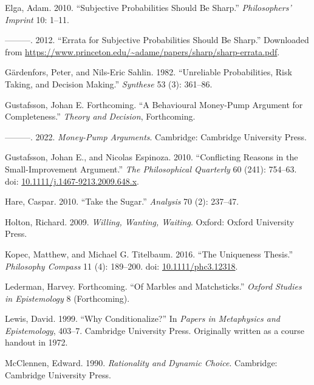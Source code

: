 \documentclass[
  11pt,
  letterpaper,
  DIV=11,
  numbers=noendperiod,
  twoside]{scrartcl}
\newlength{\cslhangindent}
\newenvironment{CSLReferences}[2] %
 {\begin{list}{}{%
  \setlength{\itemindent}{0pt}
  \setlength{\leftmargin}{0pt}
  \setlength{\parsep}{0pt}
  \ifodd #1
   \setlength{\leftmargin}{\cslhangindent}
   \setlength{\itemindent}{-1\cslhangindent}
  \fi
  \setlength{\itemsep}{#2\baselineskip}}}
 {\end{list}}
\begin{document}
\begin{CSLReferences}{1}{0}
Elga, Adam. 2010. {``Subjective Probabilities Should Be Sharp.''}
\emph{Philosophers' Imprint} 10: 1--11.

---------. 2012. {``Errata for Subjective Probabilities Should Be
Sharp.''} Downloaded from
\url{https://www.princeton.edu/~adame/papers/sharp/sharp-errata.pdf}.

Gärdenfors, Peter, and Nils-Eric Sahlin. 1982. {``Unreliable
Probabilities, Risk Taking, and Decision Making.''} \emph{Synthese} 53
(3): 361--86.

Gustafsson, Johan E. Forthcoming. {``A Behavioural Money-Pump Argument
for Completeness.''} \emph{Theory and Decision}, Forthcoming.

---------. 2022. \emph{Money-Pump Arguments}. Cambridge: Cambridge
University Press.

Gustafsson, Johan E., and Nicolas Espinoza. 2010. {``Conflicting Reasons
in the Small-Improvement Argument.''} \emph{The Philosophical Quarterly}
60 (241): 754--63. doi:
\href{https://doi.org/10.1111/j.1467-9213.2009.648.x}{10.1111/j.1467-9213.2009.648.x}.

Hare, Caspar. 2010. {``Take the Sugar.''} \emph{Analysis} 70 (2):
237--47.

Holton, Richard. 2009. \emph{Willing, Wanting, Waiting}. Oxford: Oxford
University Press.

Kopec, Matthew, and Michael G. Titelbaum. 2016. {``The Uniqueness
Thesis.''} \emph{Philosophy Compass} 11 (4): 189--200. doi:
\href{https://doi.org/10.1111/phc3.12318}{10.1111/phc3.12318}.

Lederman, Harvey. Forthcoming. {``Of Marbles and Matchsticks.''}
\emph{Oxford Studies in Epistemology} 8 (Forthcoming).

Lewis, David. 1999. {``Why Conditionalize?''} In \emph{Papers in
Metaphysics and Epistemology}, 403--7. Cambridge University Press.
Originally written as a course handout in 1972.

McClennen, Edward. 1990. \emph{Rationality and Dynamic Choice}.
Cambridge: {C}ambridge {U}niversity {P}ress.


\end{CSLReferences}
\end{document}
